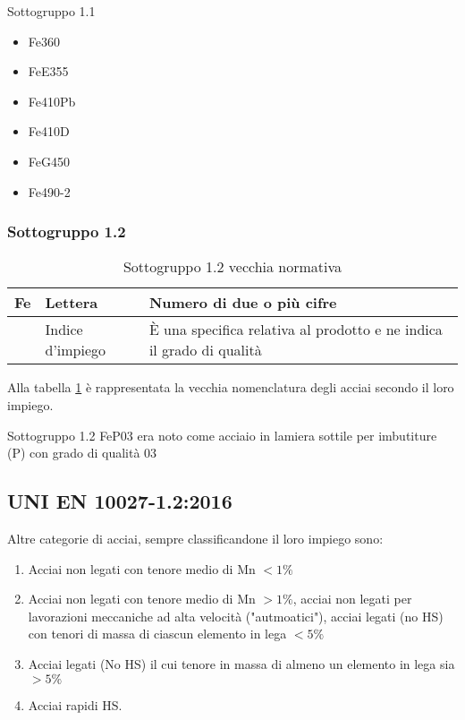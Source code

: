 \begin{example}{Sottogruppo 1.1}
\begin{multicols}{3}
\begin{itemize}
\item Fe360
\item FeE355
\columnbreak
\item Fe410Pb
\item Fe410D
\columnbreak
\item FeG450
\item Fe490-2
\end{itemize}
\end{multicols}
\end{example}

\subsubsection*{Sottogruppo 1.2}
\begin{table}
\centering
\caption{Sottogruppo 1.2 vecchia normativa}\label{tab:OldLaw1.2}
\begin{tabularx}{\textwidth}{|c|X|X|}
\toprule
\textbf{Fe} & \textbf{Lettera} & \textbf{Numero di due o più cifre}\\
\midrule
&
Indice d'impiego
&
È una specifica relativa al prodotto e ne indica il grado di qualità\\
\bottomrule
\end{tabularx}
\end{table}
Alla tabella \ref{tab:OldLaw1.2} è rappresentata la vecchia nomenclatura degli acciai secondo il loro impiego.

\begin{example}{Sottogruppo 1.2}
FeP03 era noto come acciaio in lamiera sottile per imbutiture (P) con grado di qualità 03
\end{example}

\subsection{UNI EN 10027-1.2:2016}
Altre categorie di acciai, sempre classificandone il loro impiego sono:
\begin{enumerate}
\item Acciai non legati con tenore medio di Mn $<1\%$
\item Acciai non legati con tenore medio di Mn $>1\%$, acciai non legati per lavorazioni meccaniche ad alta velocità ("autmoatici"), acciai legati (no HS) con tenori di massa di ciascun elemento in lega $<5\%$
\item Acciai legati (No HS) il cui tenore in massa di almeno un elemento in lega sia $>5\%$
\item Acciai rapidi HS.
\end{enumerate}

